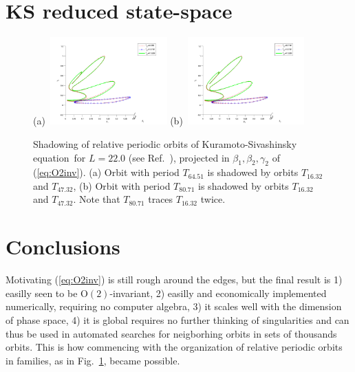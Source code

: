 \documentclass[aip,cha,showpacs,twocolumn,
 		  reprint]{revtex4-1} %
\newcommand{\refref} [1] {Ref.~\cite{#1}}
\newcommand{\refeq}  [1] {(\ref{#1})}
\newcommand{\reffig} [1] {Fig.~\ref{#1}}
\newcommand{\KSe}{Kuramoto-Siva\-shin\-sky equation}
\newcommand{\On}[1]{\ensuremath{\textrm{O}(#1)}}
\begin{document}
\section{KS reduced state-space}

\begin{figure}
 (a)~\includegraphics[width=0.40\textwidth]{../figs/ks22rpo_shad1}
 (b)~\includegraphics[width=0.40\textwidth]{../figs/ks22rpo_shad2}
\caption{
 Shadowing of relative periodic orbits of \KSe\ for $L=22.0$ (see \refref{SCD07}),
projected in $\beta_1, \beta_2, \gamma_2$ of
\refeq{eq:O2inv}. (a) Orbit with period $T_{64.51}$ is shadowed by
orbits $T_{16.32}$ and $T_{47.32}$, (b) Orbit with period
$T_{80.71}$ is shadowed by orbits $T_{16.32}$ and $T_{47.32}$. Note
that $T_{80.71}$ traces $T_{16.32}$ twice.
}
\label{fig:rpo_shad}
\end{figure}


\section{Conclusions}

Motivating \refeq{eq:O2inv} is still rough around the edges, but the final result is
1) easilly seen to be $\On{2}$-invariant, 2) easilly and economically
implemented numerically, requiring no computer algebra, 3) it scales well
with the dimension of phase space, 4) it is global requires no further
thinking of singularities and can thus be used in automated searches for
neigborhing orbits in sets of thousands orbits. This is how commencing with the
organization of relative periodic orbits in families, as in \reffig{fig:rpo_shad},
became possible.


\end{document}
